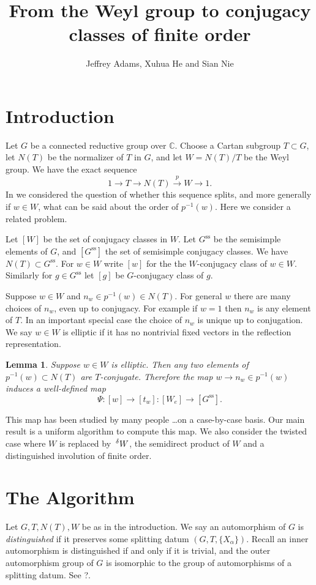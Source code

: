 \documentclass[12pt,leqno]{article}
\newtheorem{lemma}[equation]{Lemma}
\newcommand{\C}{\mathbb C}
\renewcommand{\sec}[1]{\section{#1}
\renewcommand{\theequation}{\thesection.\arabic{equation}}
  \setcounter{equation}{0}}
\newcommand\inv{^{-1}}
\newcommand{\Wconj}{[W]}
\newcommand{\Weconj}{[{W_e}]}
\newcommand{\Gssconj}{[{G^\text{ss}}]}
\newcommand{\Gss}{G^\text{ss}}
\newcommand{\Wext}{\negthinspace\negthinspace\phantom{a}^\delta W}
\renewcommand{\sec}[1]{\section{#1}
\renewcommand{\theequation}{\thesection.\arabic{equation}}
  \setcounter{equation}{0}}
\begin{document}
\title{From the Weyl group to conjugacy classes of finite order}
\author{Jeffrey Adams, Xuhua He and Sian Nie}
\maketitle

\sec{Introduction}

Let $G$ be a connected reductive group over $\C$.
Choose a Cartan subgroup $T\subset G$, let $N(T)$ be the normalizer of $T$ in $G$,
and let $W=N(T)/T$ be the Weyl group.
We have the exact sequence
\begin{equation}
\label{e:exactW}
1\rightarrow T\rightarrow N(T)\overset p\rightarrow W\rightarrow 1.
\end{equation}
In \cite{AH} we considered the question of whether this sequence splits,
and more generally if $w\in W$, what can be said about the order of $p\inv(w)$.
Here we consider a related problem.

Let $\Wconj$ be the set of conjugacy classes in $W$. Let $\Gss$ be the
semisimple elements of $G$, and $\Gssconj$ the set of semisimple
conjugacy classes. We have $N(T)\subset \Gss$. For $w\in W$ write $[w]$ for the the $W$-conjugacy
class of $w\in W$. Similarly for $g\in \Gss$ let $[g]$ be
$G$-conjugacy class of $g$.

Suppose $w\in W$ and $n_w\in p\inv(w)\in N(T)$. For general $w$ there
are many choices of $n_w$, even up to conjugacy. For example if $w=1$
then $n_w$ is any element of $T$. In an important special case the
choice of $n_w$ is unique up to conjugation. We say $w\in W$ is elliptic
if it has no nontrivial fixed vectors in the reflection
representation.


\begin{lemma}
Suppose $w\in W$ is elliptic. Then any two elements of
$p\inv(w)\subset N(T)$ are $T$-conjugate. Therefore the map $w\rightarrow n_w\in p\inv(w)$ induces
a well-defined map
$$
\Psi:[w]\rightarrow [t_w]: \Weconj\rightarrow\Gssconj.
$$
\end{lemma}
This map has been studied by many people \dots on a case-by-case
basis. Our main result is a uniform algorithm to compute this map. We
also consider the twisted case where $W$ is replaced by $\Wext$, the
semidirect product of $W$ and a distinguished involution of finite
order.

\sec{The Algorithm}\label{const}

Let $G,T,N(T),W$ be as in the introduction.  We say an automorphism of
$G$ is {\it distinguished} if it preserves some splitting datum
$(G,T,\{X_\alpha\})$. Recall an inner automorphism is distinguished if
and only if it is trivial, and the outer automorphism group of $G$ is
isomorphic to the group of automorphisms of a splitting datum. See ?.
\end{document}
